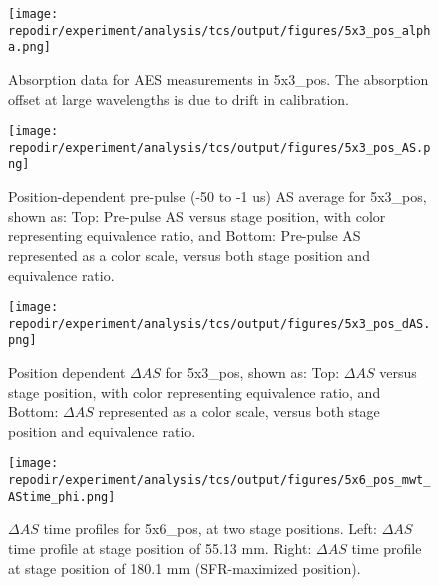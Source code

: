 \begin{figure}[]
\centering
\texttt{[image: \\repodir/experiment/analysis/tcs/output/figures/5x3\_pos\_alpha.png]}
\caption{Absorption data for AES measurements in 5x3\_pos. The absorption offset at large wavelengths is due to drift in calibration.}
\label{fig:SI_5x3_pos_alpha}
\end{figure}%






\begin{figure}[]
\centering
\texttt{[image: \\repodir/experiment/analysis/tcs/output/figures/5x3\_pos\_AS.png]}
\caption{Position-dependent pre-pulse (-50 to -1 us) AS average for 5x3\_pos, shown as: Top: Pre-pulse AS versus stage position, with color representing equivalence ratio, and Bottom: Pre-pulse AS represented as a color scale, versus both stage position and equivalence ratio.}
\label{fig:SI_5x3_pos_AS}
\end{figure}


\begin{figure}[]
    \centering
    \texttt{[image: \\repodir/experiment/analysis/tcs/output/figures/5x3\_pos\_dAS.png]} 
    \caption{Position dependent $\Delta AS$ for 5x3\_pos, shown as: Top: $\Delta AS$ versus stage position, with color representing equivalence ratio, and Bottom: $\Delta AS$ represented as a color scale, versus both stage position and equivalence ratio.}
    \label{fig:SI_5x3_pos_dAS}
\end{figure}


\begin{figure}[]
\centering
\texttt{[image: \\repodir/experiment/analysis/tcs/output/figures/5x6\_pos\_mwt\_AStime\_phi.png]}
\caption{$\Delta AS$ time profiles for 5x6\_pos, at two stage positions. Left: $\Delta AS$ time profile at stage position of 55.13 mm. Right: $\Delta AS$ time profile at stage position of 180.1 mm (SFR-maximized position).}
\label{fig:SI_5x6_pos_mwt_AStime_phi}
\end{figure}


